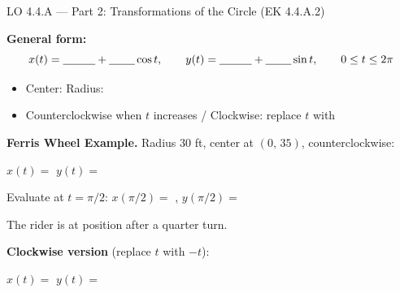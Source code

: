 \documentclass[10pt]{article}
\begin{document}
\vspace{0.08in}

\begin{notesbox}{LO 4.4.A --- Part 2: Transformations of the Circle (EK 4.4.A.2)}

\textbf{General form:}
\[
  x(t) = \underline{\hspace{1cm}} + \underline{\hspace{0.8cm}}\cos t, \qquad
  y(t) = \underline{\hspace{1cm}} + \underline{\hspace{0.8cm}}\sin t, \qquad
  0 \le t \le 2\pi
\]
\begin{itemize}[leftmargin=1.4em, itemsep=2pt]
  \item Center: \underline{\hspace{3cm}} \quad Radius: \underline{\hspace{2cm}}
  \item Counterclockwise when $t$ increases \quad / \quad Clockwise: replace $t$
    with \underline{\hspace{1.5cm}}
\end{itemize}

\vspace{8pt}
\textbf{Ferris Wheel Example.} Radius 30 ft, center at $(0,\,35)$, counterclockwise:

\vspace{4pt}
$x(t) = $ \blank{4cm} \qquad $y(t) = $ \blank{4cm}

\vspace{6pt}
Evaluate at $t = \pi/2$: \quad $x(\pi/2) = $ \blank{2cm}, \quad $y(\pi/2) = $ \blank{2cm}

The rider is at position \blank{3cm} after a quarter turn.

\vspace{6pt}
\textbf{Clockwise version} (replace $t$ with $-t$):

$x(t) = $ \blank{4cm} \qquad $y(t) = $ \blank{4cm}

\end{notesbox}

\vspace{0.08in}
\end{document}
